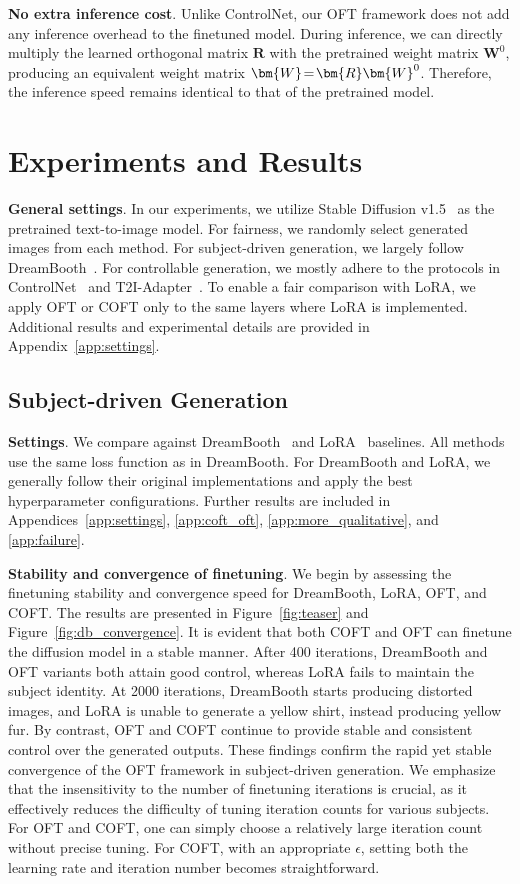 \textbf{No extra inference cost}. Unlike ControlNet, our OFT framework does not add any inference overhead to the finetuned model. During inference, we can directly multiply the learned orthogonal matrix $\bm{R}$ with the pretrained weight matrix $\bm{W}^0$, producing an equivalent weight matrix $\thickmuskip=2mu \medmuskip=2mu \bm{W} = \bm{R}\bm{W}^0$. Therefore, the inference speed remains identical to that of the pretrained model.

\section{Experiments and Results}

\textbf{General settings}. In our experiments, we utilize Stable Diffusion v1.5~\cite{rombach2022high} as the pretrained text-to-image model. For fairness, we randomly select generated images from each method. For subject-driven generation, we largely follow DreamBooth~\cite{ruiz2023dreambooth}. For controllable generation, we mostly adhere to the protocols in ControlNet~\cite{zhang2023adding} and T2I-Adapter~\cite{mou2023t2i}. To enable a fair comparison with LoRA, we apply OFT or COFT only to the same layers where LoRA is implemented. Additional results and experimental details are provided in Appendix~\ref{app:settings}.

\subsection{Subject-driven Generation}

\textbf{Settings}. We compare against DreamBooth~\cite{ruiz2023dreambooth} and LoRA~\cite{hulora2022} baselines. All methods use the same loss function as in DreamBooth. For DreamBooth and LoRA, we generally follow their original implementations and apply the best hyperparameter configurations. Further results are included in Appendices~\ref{app:settings}, \ref{app:coft_oft}, \ref{app:more_qualitative}, and \ref{app:failure}.

\textbf{Stability and convergence of finetuning}. We begin by assessing the finetuning stability and convergence speed for DreamBooth, LoRA, OFT, and COFT. The results are presented in Figure~\ref{fig:teaser} and Figure~\ref{fig:db_convergence}. It is evident that both COFT and OFT can finetune the diffusion model in a stable manner. After 400 iterations, DreamBooth and OFT variants both attain good control, whereas LoRA fails to maintain the subject identity. At 2000 iterations, DreamBooth starts producing distorted images, and LoRA is unable to generate a yellow shirt, instead producing yellow fur. By contrast, OFT and COFT continue to provide stable and consistent control over the generated outputs. These findings confirm the rapid yet stable convergence of the OFT framework in subject-driven generation. We emphasize that the insensitivity to the number of finetuning iterations is crucial, as it effectively reduces the difficulty of tuning iteration counts for various subjects. For OFT and COFT, one can simply choose a relatively large iteration count without precise tuning. For COFT, with an appropriate $\epsilon$, setting both the learning rate and iteration number becomes straightforward.

